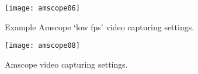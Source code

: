 \begin{figure}[hb!]
	\centering
	\texttt{[image: amscope06]}
	\caption{Example Amscope `low fps' video capturing settings.}
	\label{fig:low-fps}
\end{figure}

\begin{figure}[ht]
	\centering
	\texttt{[image: amscope08]}
	\caption{Amscope video capturing settings.}
	\label{fig:am-cap}
\end{figure}


%
%

